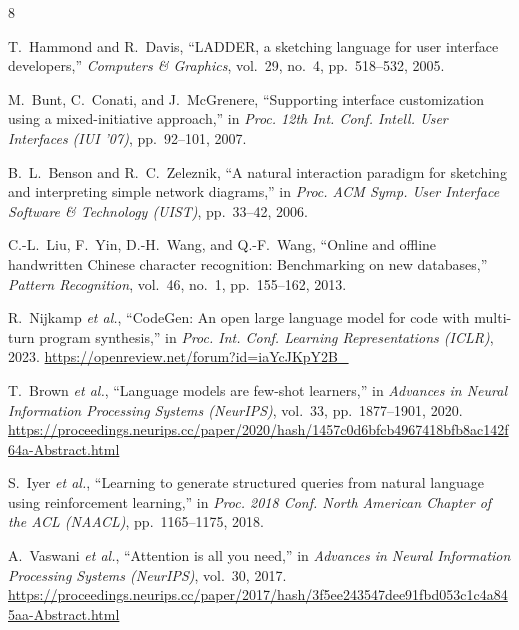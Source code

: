 \documentclass[conference]{IEEEtran}
\begin{document}
\begin{thebibliography}{8}

T.~Hammond and R.~Davis,
``LADDER, a sketching language for user interface developers,''
\textit{Computers \& Graphics}, vol.~29, no.~4, pp.~518--532, 2005.

M.~Bunt, C.~Conati, and J.~McGrenere,
``Supporting interface customization using a mixed-initiative approach,''
in \textit{Proc. 12th Int. Conf. Intell. User Interfaces (IUI '07)},
pp.~92--101, 2007.

B.~L.~Benson and R.~C.~Zeleznik,
``A natural interaction paradigm for sketching and interpreting
simple network diagrams,''
in \textit{Proc. ACM Symp. User Interface Software \& Technology (UIST)},
pp.~33--42, 2006.

C.-L.~Liu, F.~Yin, D.-H.~Wang, and Q.-F.~Wang,
``Online and offline handwritten Chinese character recognition:
Benchmarking on new databases,''
\textit{Pattern Recognition}, vol.~46, no.~1, pp.~155--162, 2013.

R.~Nijkamp \textit{et al.},
``CodeGen: An open large language model for code with multi-turn program
synthesis,''
in \textit{Proc. Int. Conf. Learning Representations (ICLR)}, 2023.
\url{https://openreview.net/forum?id=iaYcJKpY2B_}

T.~Brown \textit{et al.},
``Language models are few-shot learners,''
in \textit{Advances in Neural Information Processing Systems
(NeurIPS)}, vol.~33, pp.~1877--1901, 2020.
\url{https://proceedings.neurips.cc/paper/2020/hash/1457c0d6bfcb4967418bfb8ac142f64a-Abstract.html}

S.~Iyer \textit{et al.},
``Learning to generate structured queries from natural language using
reinforcement learning,''
in \textit{Proc. 2018 Conf. North American Chapter of the ACL (NAACL)},
pp.~1165--1175, 2018.

A.~Vaswani \textit{et al.},
``Attention is all you need,''
in \textit{Advances in Neural Information Processing Systems (NeurIPS)},
vol.~30, 2017.
\url{https://proceedings.neurips.cc/paper/2017/hash/3f5ee243547dee91fbd053c1c4a845aa-Abstract.html}

\end{thebibliography}

\balance
\end{document}
